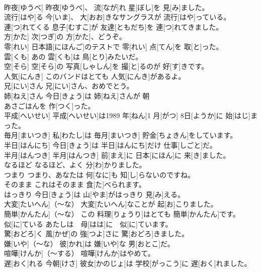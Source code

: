 \documentclass[8pt]{extreport}
\begin{document}
\begin{CJK}{UTF8}{min}
\\	昨夜[ゆうべ]	昨夜[ゆうべ]、 流[なが]れ 星[ぼし]を 見[み]ました。		
\\	流行[はや]る	今[いま]、 大[おお]きなサングラスが 流行[はや]っている。		
\\	連[つ]れてくる	息子[むすこ]が 友達[ともだち]を 連[つ]れてきました。		
\\	方[かた]	次[つぎ]の 方[かた]、どうぞ。		
\\	零[れい]	日本語[にほんご]のテストで 零[れい] 点[てん]を 取[と]った。		
\\	雲[くも]	あの 雲[くも]は 鳥[とり]みたいだ。		
\\	空[そら]	空[そら]の 写真[しゃしん]を 撮[と]るのが 好[す]きです。		
\\	人気[にんき]	このバンドはとても 人気[にんき]があるよ。		
\\	兄[にい]さん	兄[にい]さん、おめでとう。		
\\	姉[ねえ]さん	今日[きょう]は 姉[ねえ]さんが 朝
\\	あさごはんを 作[つく]った。		
\\	平成[へいせい]	平成[へいせい]は1989 年[ねん]1 月[がつ] 8日[ようか]に 始[はじ]まった。		
\\	毎月[まいつき]	私[わたし]は 毎月[まいつき] 貯金[ちょきん]をしています。		
\\	半日[はんにち]	今日[きょう]は 半日[はんにち]だけ 仕事[しごと]だ。
\\	半月[はんつき]	半月[はんつき] 前[まえ]に 日本[にほん]に 来[き]ました。		
\\	なるほど	なるほど、よく 分[わ]かりました。		
\\	つまり	つまり、あなたは 何[なに]も 知[し]らないのですね。		
\\	そのまま	これはそのまま 食[た]べられます。		
\\	はっきり	今日[きょう]は 山[やま]がはっきり 見[み]える。		
\\	大変[たいへん]（～な）	大変[たいへん]なことが 起[お]こりました。		
\\	簡単[かんたん]（～な）	この 料理[りょうり]はとても 簡単[かんたん]です。		
\\	似[に]ている	あたしは　母[はは]に　似[に]ています。		
\\	驚[おどろ]く	風[かぜ]の 強[つよ]さに 驚[おどろ]きました。		
\\	嫌[いや]（～な）	彼[かれ]は 嫌[いや]な 男[おとこ]だ。		
\\	喧嘩[けんか]（～する）	喧嘩[けんか]はやめて。		
\\	遅[おく]れる	今朝[けさ] 彼女[かのじょ]は 学校[がっこう]に 遅[おく]れました。		

\end{CJK}
\end{document}
